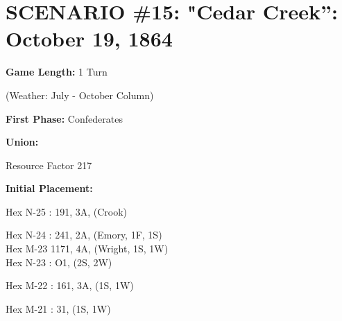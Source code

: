 \section{SCENARIO \#15: "Cedar Creek'': October 19, 1864
}


\begin{scenariodata}
\textbf{Game Length:} 1 Turn\\
\end{scenariodata}

\begin{scenariodata}
(Weather: July - October Column)\\
\end{scenariodata}

\begin{scenariodata}
\textbf{First Phase:} Confederates\\
\end{scenariodata}

\begin{scenariodata}
\textbf{Union:}\\
\end{scenariodata}

\begin{scenariodata}
Resource Factor 217\\
\end{scenariodata}

\begin{scenariodata}
\textbf{Initial Placement:}\\
\end{scenariodata}

\begin{scenariodata}
Hex N-25 : 191, 3A, (Crook)\\
\end{scenariodata}

\begin{scenariodata}
Hex N-24 : 241, 2A, (Emory, 1F, 1S)\\
Hex M-23 1171, 4A, (Wright, 1S, 1W)\\
Hex N-23 : O1, (2S, 2W)\\
\end{scenariodata}

\begin{scenariodata}
Hex M-22 : 161, 3A, (1S, 1W)\\
\end{scenariodata}

\begin{scenariodata}
Hex M-21 : 31, (1S, 1W)\\
\end{scenariodata}

